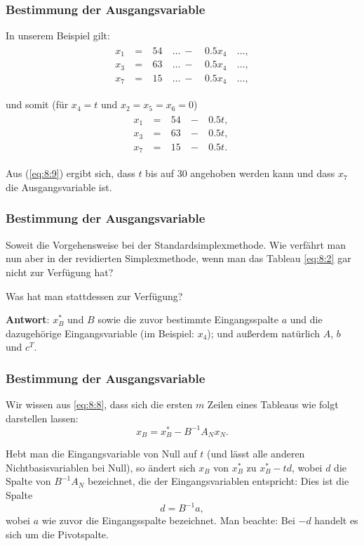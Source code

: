 \documentclass[smaller]{beamer}
\begin{document}
\begin{frame}
 \frametitle{Bestimmung der Ausgangsvariable}
 In unserem Beispiel gilt:
 \begin{align*}
\begin{alignedat}{3}
x_1 &\ = &\ 54 &\ \ldots\ - &\ 0.5x_4 &\ \ldots, \\
x_3 &\ = &\ 63 &\ \ldots\ - &\ 0.5x_4 &\ \ldots, \\
x_7 &\ = &\ 15 &\ \ldots\ - &\ 0.5x_4 &\ \ldots,
\end{alignedat}
\end{align*} 

und somit (für $x_4=t$ und $x_2=x_5=x_6=0$)
\begin{align}
\begin{alignedat}{3}
\label{eq:8:9}
x_1 &\ = &\ 54 &\ - &\ 0.5t,\ \\
x_3 &\ = &\ 63 &\ - &\ 0.5t,\ \\
x_7 &\ = &\ 15 &\ - &\ 0.5t.\  
\end{alignedat}
\end{align}

Aus (\ref{eq:8:9}) ergibt sich, dass $t$ bis auf 30 angehoben werden kann und dass \alert{$x_7$ die Ausgangsvariable} ist.
\end{frame}

\begin{frame}
 \frametitle{Bestimmung der Ausgangsvariable}
 Soweit die Vorgehensweise bei der Standardsimplexmethode. \alert{Wie verfährt man nun aber in der revidierten Simplexmethode, wenn man das Tableau \eqref{eq:8:2} gar nicht zur Verfügung hat?} \\ \vspace*{0.2cm}

Was hat man stattdessen zur Verfügung? \\ \vspace*{0.2cm}

\textbf{Antwort}: $x_B^*$ und $B$ sowie die zuvor bestimmte Eingangsspalte $a$ und die dazugehörige Eingangsvariable (im Beispiel: $x_4$); und außerdem natürlich $A$, $b$ und $c^T$. \\ \vspace*{0.2cm}

\end{frame}

\begin{frame}
 \frametitle{Bestimmung der Ausgangsvariable}
 Wir wissen aus \eqref{eq:8:8}, dass sich die ersten $m$ Zeilen eines Tableaus wie folgt darstellen lassen:
\[
x_B = x_B^* - B^{-1}A_Nx_N.
\]

Hebt man die Eingangsvariable von Null auf $t$ (und lässt alle anderen Nichtbasisvariablen bei Null), so ändert sich $x_B$ von $x_B^*$ zu $x_B^*-td$, wobei $d$ die Spalte von $B^{-1}A_N$ bezeichnet, die der Eingangsvariablen entspricht: Dies ist die Spalte
\[
d = B^{-1}a,
\]
wobei $a$ wie zuvor die Eingangsspalte bezeichnet. Man beachte: Bei $-d$ handelt es sich um die \alert{Pivotspalte}.
\end{frame}
\end{document}
